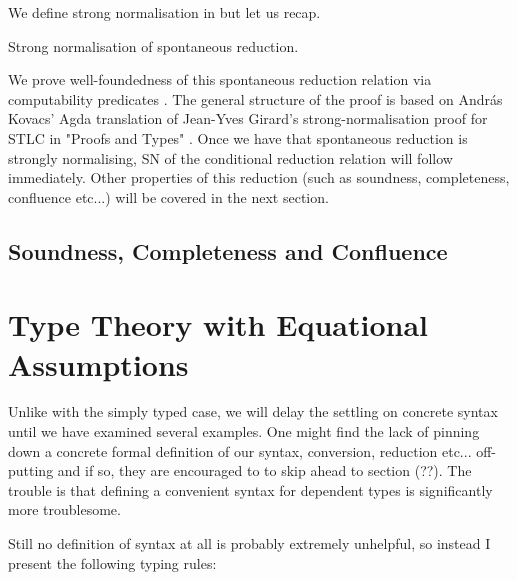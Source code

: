 \documentclass[
    a4paper, %
    fontsize=9.5pt, %
    twoside=false, %
	numbers=noenddot, %
	fontmethod=tex, %
]{kaobook}
\def\resethooks{%
  \global\let\SaveRestoreHook\empty
  \global\let\ColumnHook\empty}
\begin{document}
We define strong normalisation in %
but let us recap.

Strong normalisation of spontaneous reduction.
\begin{hscode}\SaveRestoreHook
\ColumnHook
\end{hscode}\resethooks

We prove well-foundedness of this spontaneous reduction relation via 
computability predicates . The general 
structure of the proof is based on András Kovacs' 
Agda translation  of Jean-Yves Girard's 
strong-normalisation proof for STLC in "Proofs and Types" 
. Once we have that spontaneous reduction is
strongly normalising, SN of the conditional reduction relation will follow
immediately. Other properties of this reduction (such as soundness, 
completeness, confluence etc...) will be covered in the next section.

\section{Soundness, Completeness and Confluence}



\setchapterpreamble[u]{\margintoc}

\chapter{Type Theory with Equational Assumptions}

Unlike with the simply typed case, we will delay the settling on concrete syntax
until we have examined several examples. One might find the lack of pinning down
a concrete formal definition of our syntax, conversion, reduction etc...
off-putting and if so, they are encouraged to to skip ahead to section (??).
The trouble is that defining a convenient  syntax for dependent types is
significantly more troublesome.

Still no definition of syntax at all is probably extremely unhelpful, so instead
I present the following typing rules:
\end{document}
